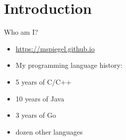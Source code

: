 \section{Introduction}


\begin{frame}[c]{Who am I?}
	\begin{itemize}
		\item \url{https://mspiegel.github.io}
		\item My programming language history:
		\item 5 years of C/C++
		\item 10 years of Java
		\item 3 years of Go
		\item \textonehalf{} dozen other languages
	\end{itemize}
\end{frame}

